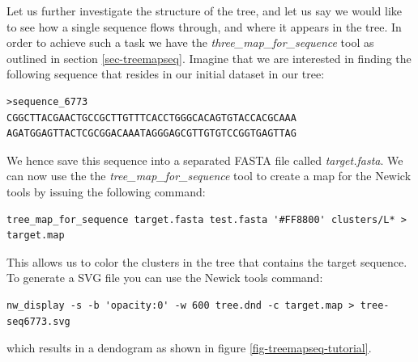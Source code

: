 Let us further investigate the structure of the tree, and let us say
we would like to see how a single sequence flows through,
and where it appears in the tree. In order to achieve such a task we
have the \emph{three\_map\_for\_sequence} tool as outlined in section
\ref{sec-treemapseq}. Imagine that we are interested in finding the following
sequence that resides in our initial dataset in our tree:
\begin{lstlisting}
>sequence_6773
CGGCTTACGAACTGCCGCTTGTTTCACCTGGGCACAGTGTACCACGCAAA
AGATGGAGTTACTCGCGGACAAATAGGGAGCGTTGTGTCCGGTGAGTTAG
\end{lstlisting}
We hence save this sequence into a separated FASTA file called
\emph{target.fasta}.
We can now use the the \emph{tree\_map\_for\_sequence} tool to create
a map for the Newick tools by issuing the following command:
\begin{lstlisting}
tree_map_for_sequence target.fasta test.fasta '#FF8800' clusters/L* > target.map
\end{lstlisting}
This allows us to color the clusters in the tree that contains the
target sequence. To generate a SVG file you can use the Newick tools
command:
\begin{lstlisting}
nw_display -s -b 'opacity:0' -w 600 tree.dnd -c target.map > tree-seq6773.svg
\end{lstlisting}
which results in a dendogram as shown in figure \ref{fig-treemapseq-tutorial}.
